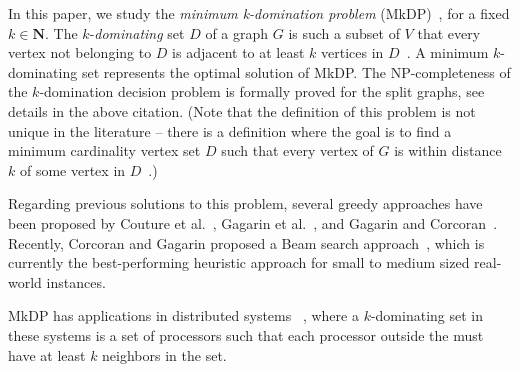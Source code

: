 \documentclass[dvipsnames,format=sigconf]{acmart} %
\begin{document}
In this paper, we study the \emph{minimum k-domination problem} (MkDP)~\cite{corcoran2021heuristics}, for a fixed $k \in \mathbf{N}$. 
The $k$-\emph{dominating} set $D$ of a graph $G$ is such a subset of $V$ that every vertex not belonging to $D$ is adjacent to at least $k$ vertices in $D$~\cite{lan2013algorithmic}. A minimum $k$-dominating set represents the optimal solution of MkDP. The NP-completeness of the $k$-domination decision problem is formally proved for the split graphs, see details in the above citation. (Note that the definition of this problem is not unique in the literature -- there is a definition where the goal is to find a minimum cardinality vertex set $D$ such that every vertex of $G$ is within distance $k$ of some vertex in $D$~\cite{chang1983k}.) 
 
Regarding previous solutions to this problem, several greedy approaches have been proposed by Couture et al.~\cite{couture2006incremental}, Gagarin et al.~\cite{gagarin2013randomized}, and Gagarin and Corcoran~\cite{gagarin2018multiple}. Recently, Corcoran and Gagarin proposed a Beam search approach~\cite{corcoran2021heuristics}, which is currently the best-performing heuristic approach for small to medium sized real-world instances. 
 
MkDP has applications in distributed systems ~\cite{wang2013minimising}, where a $k$-dominating set in these systems is a set of processors such that each processor outside the must have at least $k$ neighbors in the set.
\end{document}
